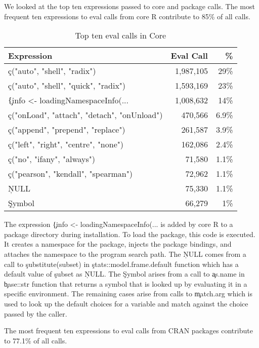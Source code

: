 \documentclass[screen,acmsmall]{acmart}
\begin{document}
We looked at the top ten expressions passed to core and package \eval
calls. The most frequent ten expressions to eval calls from core R
contribute to 85\% of all \eval calls.

\begin{table}[!h] \centering
\begin{tabular}{@{}l|rr@{}} \hline
Expression & Eval Call &  \% \\\hline
\c{c("auto", "shell", "radix")} & 1,987,105 & 29\%\\
\c{c("auto", "shell", "quick", "radix")} & 1,593,169  & 23\%\\
\c{\{info <- loadingNamespaceInfo(...} & 1,008,632 &       14\%\\
\c{c("onLoad", "attach", "detach", "onUnload")}   & 470,566 &      6.9\%\\
\c{c("append", "prepend", "replace")} &              261,587&       3.9\% \\
\c{c("left", "right", "centre", "none")} & 162,086     & 2.4\%\\
\c{c("no", "ifany", "always")}   &                71,580 &       1.1\%\\
\c{c("pearson", "kendall", "spearman")}  & 72,962 &      1.1\%\\
\c{NULL}& 75,330  &      1.1\% \\
\c{Symbol}&                 66,279&       1\%\\\hline
\end{tabular}
\caption{Top ten eval calls in Core}\label{B}
\end{table}

The expression \c{\{info <- loadingNamespaceInfo(...} is added by core
R to a package directory during installation. To load the package,
this code is executed. It creates a namespace for the package, injects
the package bindings, and attaches the namespace to the program search
path. The \c{NULL} comes from a call to \c{substitute(subset)} in
\c{stats::model.frame.default} function which has a default value of
\c{subset} as \c{NULL}. The \c{Symbol} arises from a call to
\c{as.name} in \c{base::str} function that returns a symbol that is
looked up by evaluating it in a specific environment. The remaining
cases arise from calls to \c{match.arg} which is used to look up the
default choices for a variable and match against the choice passed by
the caller.

The most frequent ten expressions to eval calls from CRAN packages
contribute to 77.1\% of all \eval calls.
\end{document}
